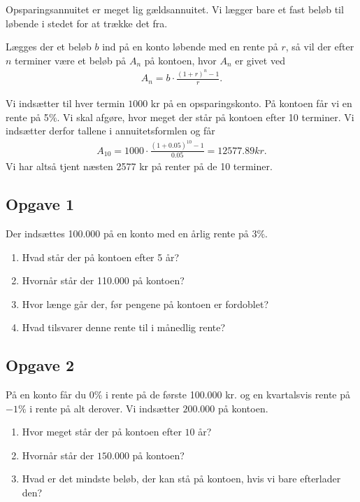 Opsparingsannuitet er meget lig gældsannuitet. Vi lægger bare et fast beløb til løbende i stedet for at trække det fra. 

\begin{setn}[Opsparingsannuitet]
	Lægges der et beløb $b$ ind på en konto løbende med en rente på $r$, så vil der efter $n$ terminer være et 
	beløb på $A_n$ på kontoen, hvor $A_n$ er givet ved
	\begin{align*}
		A_n = b\cdot \frac{(1+r)^n-1}{r}.
	\end{align*}
\end{setn}

\begin{exa}
	Vi indsætter til hver termin $1000$ kr på en opsparingskonto. På kontoen får vi en rente på 5$\%$. Vi skal
	afgøre, hvor meget der står på kontoen efter 10 terminer. Vi indsætter derfor tallene i annuitetsformlen og får
	\begin{align*}
		A_{10} = 1000\cdot \frac{(1+0.05)^{10}-1}{0.05} = 12577.89kr.	
	\end{align*}	 
	Vi har altså tjent næsten 2577 kr på renter på de 10 terminer.  
\end{exa}


\subsection*{Opgave 1}
Der indsættes 100.000 på en konto med en årlig rente på $3\%$. 
\begin{enumerate}[label=\roman*)]
\item Hvad står der på kontoen efter 5 år?
\item Hvornår står der 110.000 på kontoen?
\item Hvor længe går der, før pengene på kontoen er fordoblet?
\item Hvad tilsvarer denne rente til i månedlig rente?
\end{enumerate}


\subsection*{Opgave 2}
På en konto får du $0\%$ i rente på de første 100.000 kr. og en kvartalsvis rente på $-1\%$ i rente på alt derover. Vi indsætter $200.000$ på kontoen.
\begin{enumerate}[label=\roman*)]
\item Hvor meget står der på kontoen efter $10$ år?
\item Hvornår står der $150.000$ på kontoen?
\item Hvad er det mindste beløb, der kan stå på kontoen, hvis vi bare efterlader den?
\end{enumerate}


